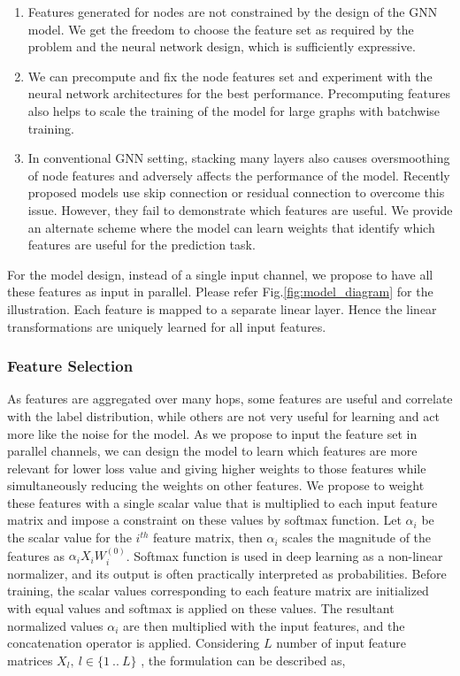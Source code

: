 \documentclass[sigconf,natbib=false]{acmart}
\begin{document}
\renewcommand{\labelenumi}{(\roman{enumi})}
\begin{enumerate}
    \item Features generated for nodes are not constrained by the design of the GNN model. We get the freedom to choose the feature set as required by the problem and the neural network design, which is sufficiently expressive.
    \item We can precompute and fix the node features set and experiment with the neural network architectures for the best performance. Precomputing features also helps to scale the training of the model for large graphs with batchwise training.
    \item In conventional GNN setting, stacking many layers also causes oversmoothing of node features \cite{chen_measuring_2019} and adversely affects the performance of the model. Recently proposed models use skip connection or residual connection to overcome this issue. However, they fail to demonstrate which features are useful. We provide an alternate scheme where the model can learn weights that identify which features are useful for the prediction task.
\end{enumerate}

For the model design, instead of a single input channel, we propose to have all these features as input in parallel. Please refer Fig.\ref{fig:model_diagram} for the illustration.  Each feature is mapped to a separate linear layer. Hence the linear transformations are uniquely learned for all input features. 

\subsubsection{Feature Selection}\hfill

As features are aggregated over many hops, some features are useful and correlate with the label distribution, while others are not very useful for learning and act more like the noise for the model. As we propose to input the feature set in parallel channels, we can design the model to learn which features are more relevant for lower loss value and giving higher weights to those features while simultaneously reducing the weights on other features. We propose to weight these features with a single scalar value that is multiplied to each input feature matrix and impose a constraint on these values by softmax function. Let $\alpha_i$ be the scalar value for the $i^{th}$ feature matrix, then $\alpha_i$ scales the magnitude of the features as $\alpha_i X_iW^{(0)}_i$. Softmax function is used in deep learning as a non-linear normalizer, and its output is often practically interpreted as probabilities. Before training, the scalar values corresponding to each feature matrix are initialized with equal values and softmax is applied on these values. The resultant normalized values $\alpha_i$ are then multiplied with the input features, and the concatenation operator is applied. Considering $L$ number of input feature matrices $X_l,\: l\in\{1\:..\:L\}$ , the formulation can be described as,
\end{document}
